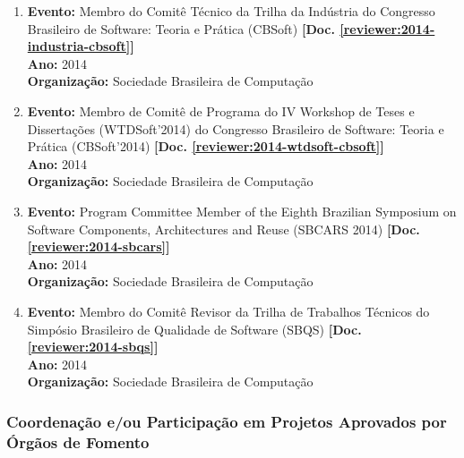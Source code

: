 \documentclass[a4paper,oneside,10pt]{article}
\begin{document}
\begin{enumerate}
\item \textbf{Evento:} Membro do Comitê Técnico da Trilha da Indústria do Congresso Brasileiro de Software: Teoria e Prática (CBSoft) \textbf{[Doc. \ref{reviewer:2014-industria-cbsoft}]}\\
      \textbf{Ano:} 2014 \\
      \textbf{Organiza\c{c}\~{a}o:} Sociedade Brasileira de Computa\c{c}\~{a}o

\item \textbf{Evento:} Membro de Comitê de Programa do IV Workshop de Teses e Dissertações (WTDSoft'2014) do Congresso Brasileiro de Software: Teoria e Prática (CBSoft'2014) \textbf{[Doc. \ref{reviewer:2014-wtdsoft-cbsoft}]}\\
      \textbf{Ano:} 2014 \\
      \textbf{Organiza\c{c}\~{a}o:} Sociedade Brasileira de Computa\c{c}\~{a}o

\item \textbf{Evento:} Program Committee Member of the Eighth Brazilian Symposium on Software Components, Architectures and Reuse (SBCARS 2014) \textbf{[Doc. \ref{reviewer:2014-sbcars}]} \\
      \textbf{Ano:} 2014 \\
      \textbf{Organiza\c{c}\~{a}o:} Sociedade Brasileira de Computa\c{c}\~{a}o

\item \textbf{Evento:} Membro do Comitê Revisor da Trilha de Trabalhos Técnicos do Simpósio Brasileiro de Qualidade de Software (SBQS) \textbf{[Doc. \ref{reviewer:2014-sbqs}]}\\
      \textbf{Ano:} 2014 \\
      \textbf{Organiza\c{c}\~{a}o:} Sociedade Brasileira de Computa\c{c}\~{a}o

\end{enumerate}


\subsubsection{Coordena\c{c}\~{a}o e/ou Participa\c{c}\~{a}o em Projetos Aprovados por \'{O}rg\~{a}os de Fomento}
\vspace{0.3cm}
\end{document}
